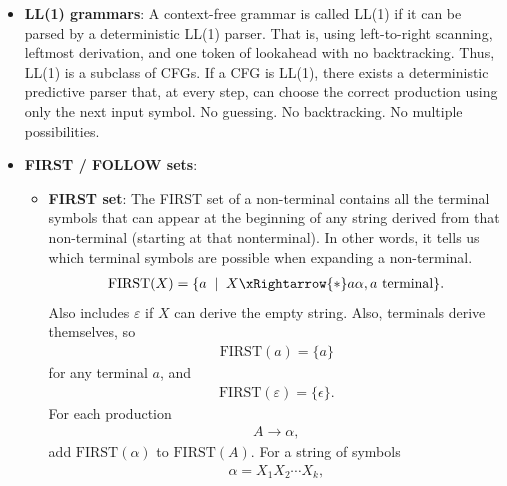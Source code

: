 \documentclass{report}
\begin{document}
\begin{itemize}
\begin{align*}
                A &\to \alpha A^{\prime} \\
                A^{\prime} &\to \beta_{1} \mid \beta_{2}
            .\end{align*}
        \item \textbf{LL(1) grammars}: A context-free grammar is called LL(1) if it can be parsed by a deterministic LL(1) parser. That is, using left-to-right scanning, leftmost derivation, and one token of lookahead with no backtracking. Thus, LL(1) is a subclass of CFGs.
            \bigbreak \noindent 
            If a CFG is LL(1), there exists a deterministic predictive parser that, at every step, can choose the correct production using only the next input symbol. No guessing. No backtracking. No multiple possibilities.
        \item \textbf{FIRST / FOLLOW sets}: 
            \begin{itemize}
                \item \textbf{FIRST set}:  The FIRST set of a non-terminal contains all the terminal symbols that can appear at the beginning of any string derived from that non-terminal (starting at that nonterminal). In other words, it tells us which terminal symbols are possible when expanding a non-terminal.
                    \begin{align*}
                        \text{FIRST}(X) = \{a \; \mid \; X \xRightarrow{*} a\alpha, a \text{ terminal}\}
                    .\end{align*}
                    Also includes $\varepsilon$ if $X$ can derive the empty string. Also, terminals derive themselves, so 
                    \begin{align*}
                        \text{FIRST}(a) = \{a\}
                    \end{align*}
                    for any terminal $a$, and
                    \begin{align*}
                        \text{FIRST}(\varepsilon) = \{\epsilon\}
                    .\end{align*}
                    For each production 
                    \begin{align*}
                        A \to \alpha
                    ,\end{align*}
                    add $\text{FIRST}(\alpha)$ to $\text{FIRST}(A)$. For a string of symbols
                    \begin{align*}
                        \alpha = X_{1}X_{2} \cdots X_{k}
                    ,\end{align*}

\end{itemize}
\end{itemize}
\end{document}
